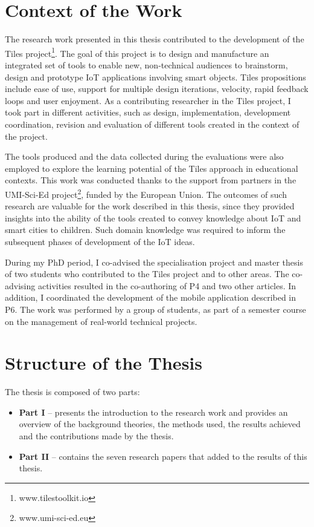\section{Context of the Work}

The research work presented in this thesis contributed to the development of the Tiles project\footnote{www.tilestoolkit.io}. The goal of this project is to design and manufacture an integrated set of tools to enable new, non-technical audiences to brainstorm, design and prototype IoT applications involving smart objects. Tiles propositions include ease of use, support for multiple design iterations, velocity, rapid feedback loops and user enjoyment. As a contributing researcher in the Tiles project, I took part in different activities, such as design, implementation, development coordination, revision and evaluation of different tools created in the context of the project.

The tools produced and the data collected during the evaluations were also employed to explore the learning potential of the Tiles approach in educational contexts. This work was conducted thanks to the support from partners in the UMI-Sci-Ed project\footnote{www.umi-sci-ed.eu}, funded by the European Union. The outcomes of such research are valuable for the work described in this thesis, since they provided insights into the ability of the tools created to convey knowledge about IoT and smart cities to children. Such domain knowledge was required to inform the subsequent phases of development of the IoT ideas.

During my PhD period, I co-advised the specialisation project and master thesis of two students who contributed to the Tiles project and to other areas. The co-advising activities resulted in the co-authoring of P4 and two other articles. In addition, I coordinated the development of the mobile application described in P6. The work was performed by a group of students, as part of a semester course on the management of real-world technical projects.


\section{Structure of the Thesis}

The thesis is composed of two parts:

\begin{itemize}
	\item \textbf{Part I} -- presents the introduction to the research work and provides an overview of the background theories, the methods used, the results achieved and the contributions made by the thesis.
	\item \textbf{Part II} -- contains the seven research papers that added to the results of this thesis.
\end{itemize}

